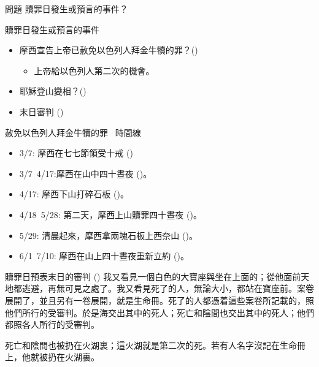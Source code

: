 \documentclass{beamer}
\newcommand{\question}[1]{
  \begin{frame}{問題}
    \centering
    \vspace*{1cm}
    \huge #1？\par
    \vfill
  \end{frame}
}
\newcommand{\parvspace}{\par\vspace{0.5em}}
\begin{document}
\question{贖罪日發生或預言的事件}

\begin{frame}{贖罪日發生或預言的事件}
  \begin{itemize}
    \item 摩西宣告上帝已赦免以色列人拜金牛犢的罪？()\parencite{GoldenCalf, SederOlamRabbah, YomKippur}
      \begin{itemize}
        \item 上帝給以色列人\alert{第二次的機會}。
      \end{itemize}
    \item 耶穌登山變相？()\parencite{YeshuaInYomKippur}
    \item 末日審判 ()
  \end{itemize}
\end{frame}

\begin{frame}{赦免以色列人拜金牛犢的罪 \textendash\ 時間線}
  \begin{itemize}
    \item 3/7: 摩西在\alert{七七節領受十戒} ()\parencite{TenCommandmentsOnShavuot}
    \item 3/7\textendash\ 4/17:摩西在山中\alert{四十晝夜} ()。
    \item 4/17: 摩西下山打碎石板 ()。
    \item 4/18\textendash\ 5/28: \alert{第二天}，摩西上山贖罪\alert{四十晝夜} ()。
    \item 5/29: \alert{清晨起來}，摩西拿兩塊石板上西奈山 ()。
    \item 6/1\textendash\ \alert{7/10}: 摩西在山上\alert{四十晝夜}重新立約 ()。
  \end{itemize}
\end{frame}

\begin{frame}{贖罪日預表末日的審判}
  () 我又看見一個白色的大寶座與坐在上面的；從他面前天地都逃避，再無可見之處了。我又看見死了的人，無論大小，都站在寶座前。案卷展開了，並且另有一卷展開，就是生命冊。\alert{死了的人都憑着這些案卷所記載的，照他們所行的受審判}。於是海交出其中的死人；死亡和陰間也交出其中的死人；他們都照各人所行的受審判。\parvspace
  死亡和陰間也被扔在火湖裏；這火湖就是第二次的死。\alert{若有人名字沒記在生命冊上，他就被扔在火湖裏}。\parvspace
\end{frame}
\end{document}
